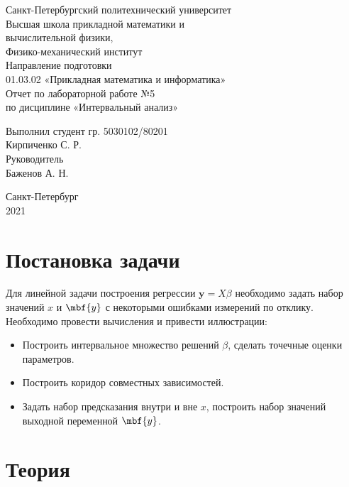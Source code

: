 \documentclass[a4paper]{article}
\begin{document}
\large
\begin{center}
    Санкт-Петербургский политехнический университет\\
    Высшая школа прикладной математики и\\вычислительной физики,\\ 
    Физико-механический институт\\
    \vspace{3em}
    Направление подготовки\\
    01.03.02 «Прикладная математика и информатика»\\
    \vspace{10em}
    \Large
    Отчет по лабораторной работе №5 \\
    по дисциплине «Интервальный анализ»
    \vspace{19em}
    \large
\end{center}
Выполнил студент гр. 5030102/80201\\
Кирпиченко С. Р.\\
Руководитель\\
Баженов А. Н.
\vspace{10em}
\begin{center}
    Санкт-Петербург\\
    2021
\end{center}
\thispagestyle{empty}
\newpage
\tableofcontents
{}
\newpage
\listoffigures
{}
\newpage
\section{Постановка задачи}
Для линейной задачи построения регрессии $\mathbf{y}=X\beta$ необходимо задать набор значений $x$ и $\mbf{y}$ с некоторыми ошибками измерений по отклику. Необходимо провести вычисления и привести иллюстрации:
\begin{itemize}
    \item Построить интервальное множество решений $\beta$, сделать точечные оценки параметров.
    \item Построить коридор совместных зависимостей.
    \item Задать набор предсказания внутри и вне $x$, построить набор значений выходной переменной $\mbf{y}$.
\end{itemize}
\section{Теория}
\end{document}

